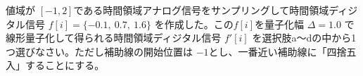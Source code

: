 値域が $[-1,2]$である時間領域アナログ信号をサンプリングして時間領域ディジタル信号 $f[i] = \{-0.1,\ 0.7,\ 1.6 \}$ を作成した。この$f[i]$を量子化幅 $\Delta = 1.0$ で線形量子化して得られる時間領域ディジタル信号 $f'[i]$ を選択肢a〜dの中から1つ選びなさい。ただし補助線の開始位置は $-1$とし、一番近い補助線に「四捨五入」することにする。
